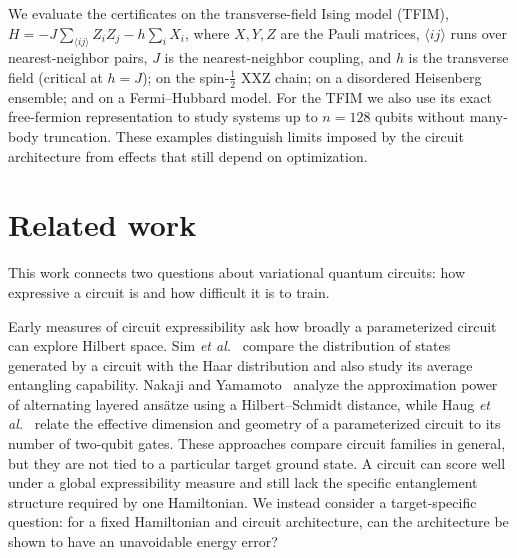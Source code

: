 \documentclass[reprint,aps,pra,floatfix,superscriptaddress,nofootinbib,longbibliography]{revtex4-2}
\theoremstyle{remark}
\theoremstyle{definition}
\begin{document}
We evaluate the certificates on the transverse-field Ising model (TFIM),
$H=-J\sum_{\langle ij\rangle}Z_iZ_j-h\sum_iX_i$, where $X,Y,Z$ are the Pauli
matrices, $\langle ij\rangle$ runs over nearest-neighbor pairs, $J$ is the
nearest-neighbor coupling, and $h$ is the transverse field (critical at $h=J$);
on the spin-$\tfrac12$ XXZ chain; on a disordered Heisenberg ensemble; and on a
Fermi--Hubbard model. For the TFIM we also use its exact free-fermion
representation to study systems up to $n=128$ qubits without many-body
truncation. These examples distinguish limits imposed by the circuit architecture from
effects that still depend on optimization.

\section{Related work}
\label{sec:related}

This work connects two questions about variational quantum circuits: how
expressive a circuit is and how difficult it is to train.

Early measures of circuit expressibility ask how broadly a parameterized circuit
can explore Hilbert space. Sim \emph{et al.}~\cite{sim2019expressibility} compare
the distribution of states generated by a circuit with the Haar distribution and
also study its average entangling capability. Nakaji and
Yamamoto~\cite{nakaji2021expressibility} analyze the approximation power of
alternating layered ans\"atze using a Hilbert--Schmidt distance, while Haug
\emph{et al.}~\cite{haug2021capacity} relate the effective dimension and geometry
of a parameterized circuit to its number of two-qubit gates. These approaches compare circuit families in general, but they are not tied to a
particular target ground state. A circuit can score well under a global
expressibility measure and still lack the specific entanglement structure
required by one Hamiltonian. We instead consider a target-specific question: for a fixed Hamiltonian and
circuit architecture, can the architecture be shown to have an unavoidable
energy error?
\end{document}

